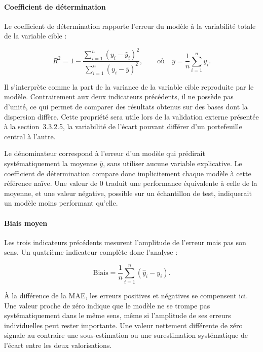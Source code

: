 \paragraph{Coefficient de détermination}
Le coefficient de détermination rapporte l'erreur du modèle à la variabilité totale de la 
variable cible :

\begin{equation}
R^2 = 1 - \frac{\sum_{i=1}^{n} \left( y_i - \hat{y}_i \right)^2}
{\sum_{i=1}^{n} \left( y_i - \bar{y} \right)^2},
\qquad \text{où} \quad \bar{y} = \frac{1}{n}\sum_{i=1}^{n} y_i.
\label{eq:r2}
\end{equation}

Il s'interprète comme la part de la variance de la variable cible reproduite par le modèle. 
Contrairement aux deux indicateurs précédents, il ne possède pas d'unité, ce qui permet de 
comparer des résultats obtenus sur des bases dont la dispersion diffère. Cette propriété 
sera utile lors de la validation externe présentée à la section~3.3.2.5, la variabilité de 
l'écart pouvant différer d'un portefeuille central à l'autre.

Le dénominateur correspond à l'erreur d'un modèle qui prédirait systématiquement la moyenne 
$\bar{y}$, sans utiliser aucune variable explicative. Le coefficient de détermination 
compare donc implicitement chaque modèle à cette référence naïve. Une valeur de $0$ traduit 
une performance équivalente à celle de la moyenne, et une valeur négative, possible sur un 
échantillon de test, indiquerait un modèle moins performant qu'elle.

\paragraph{Biais moyen}
Les trois indicateurs précédents mesurent l'amplitude de l'erreur mais pas son sens. Un 
quatrième indicateur complète donc l'analyse :

\begin{equation}
\text{Biais} = \frac{1}{n} \sum_{i=1}^{n} \left( \hat{y}_i - y_i \right).
\label{eq:biais}
\end{equation}

À la différence de la MAE, les erreurs positives et négatives se compensent ici. Une valeur 
proche de zéro indique que le modèle ne se trompe pas systématiquement dans le même sens, 
même si l'amplitude de ses erreurs individuelles peut rester importante. Une valeur 
nettement différente de zéro signale au contraire une sous-estimation ou une surestimation 
systématique de l'écart entre les deux valorisations.

